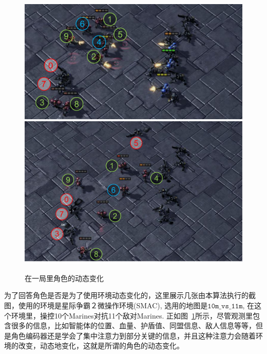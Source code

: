 \begin{figure}
    \includegraphics[height=0.24\linewidth]{figures/dynamic/10m_vs_11m-g3.pdf}\hfill
    \includegraphics[height=0.24\linewidth]{figures/dynamic/10m_vs_11m-g4.pdf}\\ 
    \hfill
    \caption{在一局里角色的动态变化}\label{fig:dynamic_role-10m_vs_11m}
\end{figure}

为了回答角色是否是为了使用环境动态变化的，这里展示几张由本算法执行的截图，使用的环境是星际争霸２微操作环境(SMAC), 选用的地图是$\mathtt{10m\_vs\_11m}$, 在这个环境里，操控10个Marines对抗11个敌对Marines. 正如图~\ref{fig:dynamic_role-10m_vs_11m}所示，尽管观测里包含很多的信息，比如智能体的位置、血量、护盾值、同盟信息、敌人信息等等，但是角色编码器还是学会了集中注意力到部分关键的信息，并且这种注意力会随着环境的改变，动态地变化，这就是所谓的角色的动态变化。

